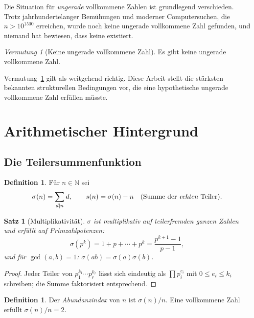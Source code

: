 \documentclass[12pt,a4paper]{amsart}
\newtheorem{satz}[theorem]{Satz}
\theoremstyle{definition}
\newtheorem{definition_de}[theorem]{Definition}
\theoremstyle{remark}
\newtheorem{vermutung}[theorem]{Vermutung}
\newcommand{\N}{\mathbb{N}}
\begin{document}
Die Situation für \emph{ungerade} vollkommene Zahlen ist grundlegend verschieden.
Trotz jahrhundertelanger Bemühungen und moderner Computersuchen, die
$n > 10^{1500}$ erreichen, wurde noch keine ungerade vollkommene Zahl gefunden,
und niemand hat bewiesen, dass keine existiert.

\begin{vermutung}[Keine ungerade vollkommene Zahl]
\label{verm:keine}
Es gibt keine ungerade vollkommene Zahl.
\end{vermutung}

Vermutung~\ref{verm:keine} gilt als weitgehend richtig.
Diese Arbeit stellt die stärksten bekannten strukturellen Bedingungen vor,
die eine hypothetische ungerade vollkommene Zahl erfüllen müsste.

\section{Arithmetischer Hintergrund}

\subsection{Die Teilersummenfunktion}

\begin{definition_de}
Für $n \in \N$ sei
\[
  \sigma(n) = \sum_{d \mid n} d, \qquad
  s(n) = \sigma(n) - n \quad \text{(Summe der \emph{echten} Teiler)}.
\]
\end{definition_de}

\begin{satz}[Multiplikativität]
$\sigma$ ist multiplikativ auf teilerfremden ganzen Zahlen und erfüllt auf Primzahlpotenzen:
\[
  \sigma(p^k) = 1 + p + \cdots + p^k = \frac{p^{k+1}-1}{p-1},
\]
und für $\gcd(a,b)=1$: $\sigma(ab) = \sigma(a)\sigma(b)$.
\end{satz}

\begin{proof}
Jeder Teiler von $p_1^{k_1}\cdots p_r^{k_r}$ lässt sich eindeutig als
$\prod p_i^{e_i}$ mit $0 \leq e_i \leq k_i$ schreiben; die Summe
faktorisiert entsprechend.
\end{proof}

\begin{definition_de}
Der \emph{Abundanzindex} von $n$ ist $\sigma(n)/n$.
Eine vollkommene Zahl erfüllt $\sigma(n)/n = 2$.
\end{definition_de}
\end{document}
